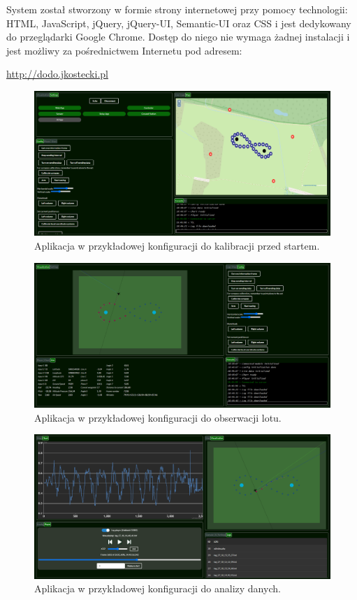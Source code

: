 \documentclass[12pt, a4paper]{article}
\begin{document}
System został stworzony w formie strony internetowej przy pomocy technologii: HTML, JavaScript, jQuery, jQuery-UI, Semantic-UI oraz CSS i jest dedykowany do przeglądarki Google Chrome. Dostęp do niego nie wymaga żadnej instalacji i jest możliwy za pośrednictwem Internetu pod adresem:

\begin{center}
\url{http://dodo.jkostecki.pl}
\end{center}

 \begin{figure}[ht]
    \centering
    \includegraphics[width=1\textwidth]{przedlotem}
    \caption{Aplikacja w przykładowej konfiguracji do kalibracji przed startem.}
    \label{fig:web1}
\end{figure}

 \begin{figure}[ht]
    \centering
    \includegraphics[width=1\textwidth]{podczaslotu}
    \caption{Aplikacja w przykładowej konfiguracji do obserwacji lotu.}
    \label{fig:web2}
\end{figure}

 \begin{figure}[ht]
    \centering
    \includegraphics[width=1\textwidth]{polocie}
    \caption{Aplikacja w przykładowej konfiguracji do analizy danych.}
    \label{fig:web3}
\end{figure}
\end{document}
